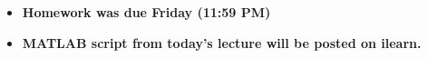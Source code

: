 \documentclass[11pt]{article}
\begin{document}
\begin{itemize}

	\item \textbf{ \LARGE Homework was due Friday (11:59 PM) } \\
	 
	\item \textbf{ \LARGE MATLAB script from today's lecture will be posted on ilearn. } \\
		
 \end{itemize}




	
\end{document}
